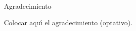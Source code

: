 \vspace*{2.5cm}

\begin{center}
{\large Agradecimiento}
\end{center}
\vspace{1cm}

Colocar aqu\'{\i} el agradecimiento (optativo).

\newpage
